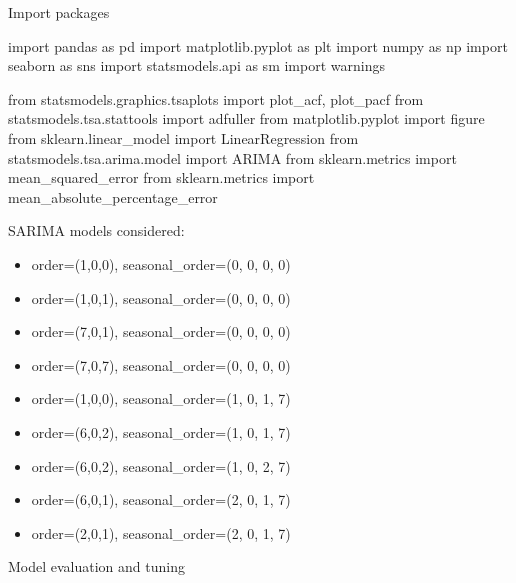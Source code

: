 \documentclass[mstat,12pt]{unswthesis}
\newenvironment{Shaded}{\begin{snugshade}}{\end{snugshade}}
\newcommand{\ImportTok}[1]{#1}
\newcommand{\NormalTok}[1]{#1}
\begin{document}
Import packages

\begin{Shaded}
\begin{Highlighting}[]
\ImportTok{import}\NormalTok{ pandas }\ImportTok{as}\NormalTok{ pd}
\ImportTok{import}\NormalTok{ matplotlib.pyplot }\ImportTok{as}\NormalTok{ plt}
\ImportTok{import}\NormalTok{ numpy }\ImportTok{as}\NormalTok{ np}
\ImportTok{import}\NormalTok{ seaborn }\ImportTok{as}\NormalTok{ sns}
\ImportTok{import}\NormalTok{ statsmodels.api }\ImportTok{as}\NormalTok{ sm}
\ImportTok{import}\NormalTok{ warnings}

\ImportTok{from}\NormalTok{ statsmodels.graphics.tsaplots }\ImportTok{import}\NormalTok{ plot\_acf, plot\_pacf}
\ImportTok{from}\NormalTok{ statsmodels.tsa.stattools }\ImportTok{import}\NormalTok{ adfuller}
\ImportTok{from}\NormalTok{ matplotlib.pyplot }\ImportTok{import}\NormalTok{ figure}
\ImportTok{from}\NormalTok{ sklearn.linear\_model }\ImportTok{import}\NormalTok{ LinearRegression}
\ImportTok{from}\NormalTok{ statsmodels.tsa.arima.model }\ImportTok{import}\NormalTok{ ARIMA}
\ImportTok{from}\NormalTok{ sklearn.metrics }\ImportTok{import}\NormalTok{ mean\_squared\_error}
\ImportTok{from}\NormalTok{ sklearn.metrics }\ImportTok{import}\NormalTok{ mean\_absolute\_percentage\_error}
\end{Highlighting}
\end{Shaded}

\noindent SARIMA models considered:

\begin{itemize}
\tightlist
\item
  order=(1,0,0), seasonal\_order=(0, 0, 0, 0)
\item
  order=(1,0,1), seasonal\_order=(0, 0, 0, 0)
\item
  order=(7,0,1), seasonal\_order=(0, 0, 0, 0)
\item
  order=(7,0,7), seasonal\_order=(0, 0, 0, 0)
\item
  order=(1,0,0), seasonal\_order=(1, 0, 1, 7)
\item
  order=(6,0,2), seasonal\_order=(1, 0, 1, 7)
\item
  order=(6,0,2), seasonal\_order=(1, 0, 2, 7)
\item
  order=(6,0,1), seasonal\_order=(2, 0, 1, 7)
\item
  order=(2,0,1), seasonal\_order=(2, 0, 1, 7)
\end{itemize}

\noindent Model evaluation and tuning
\end{document}
